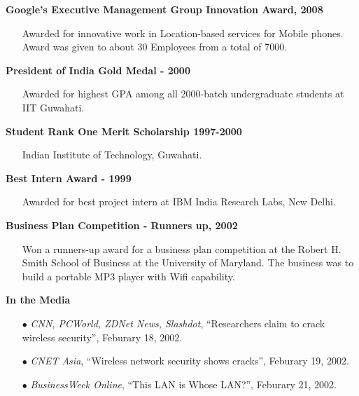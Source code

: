 \begin{resume}
{\bf Google's Executive Management Group Innovation Award, 2008}
    \begin{itemize}
         \item[] Awarded for innovative work in Location-based services for Mobile phones. Award was given to about 30 Employees from a total of 7000.
    \end{itemize}

{\bf President of India Gold Medal - 2000}
    \begin{itemize}
         \item[] Awarded for highest GPA among all 2000-batch undergraduate students at IIT Guwahati.
    \end{itemize}


{\bf Student Rank One Merit Scholarship 1997-2000}
    \begin{itemize}
         \item[] Indian Institute of Technology, Guwahati.
    \end{itemize}

{\bf Best Intern Award - 1999}
    \begin{itemize}
         \item[] Awarded for best project intern at IBM India Research Labs, New Delhi. 
    \end{itemize}

{\bf Business Plan Competition - Runners up, 2002}
    \begin{itemize}
         \item[] Won a runners-up award for a business plan competition at the
	 Robert H. Smith School of Business at the University of Maryland. The
	 business was to build a portable MP3 player with Wifi capability.
    \end{itemize}

{\bf In the Media}
    \begin{itemize}
         \item[$\bullet$] {\em CNN, PCWorld, ZDNet News, Slashdot},  ``Researchers claim to crack
           wireless security'', Feburary 18, 2002.
         \item[$\bullet$] {\em CNET Asia}, ``Wireless network security shows cracks'', Feburary 19, 2002.  
         \item[$\bullet$] {\em BusinessWeek Online}, ``This LAN is Whose LAN?'', Feburary 21, 2002. 
    \end{itemize}


\end{resume}

